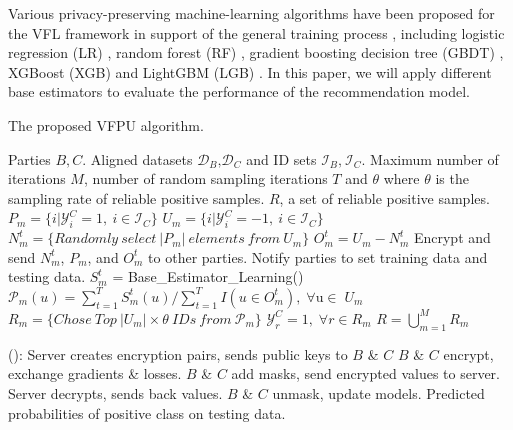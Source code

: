 \documentclass[10pt,journal,compsoc]{IEEEtran}
\begin{document}
\begin{enumerate}[label=(\arabic*)]
	Various privacy-preserving machine-learning algorithms have been proposed for the VFL framework in support of the general training process \cite{yang2019federated}, including logistic regression (LR) \cite{he2021secure,yang2019parallel}, random forest (RF) \cite{yao2022efficient}, gradient boosting decision tree (GBDT) \cite{he2021secure}, XGBoost (XGB) \cite{xu2021efficient,wang2022feverless} and LightGBM (LGB) \cite{feng2019securegbm}. In this paper, we will apply different base estimators to evaluate the performance of the recommendation model. 
	
	\begin{algorithm}[H]
		\caption{The proposed VFPU algorithm.}
		\label{alg:cap}
		\algrenewcommand{}
		\algrenewcommand{}
		\begin{algorithmic}[1]
			\Require Parties $B,C$. Aligned datasets ${{\mathsf{\mathcal{D}}}_{B}}\text{,}{{\mathsf{\mathcal{D}}}_{C}}$  and ID sets ${{\mathsf{\mathcal{I}}}_{B}}\text{,}\ {{\mathsf{\mathcal{I}}}_{C}}$. Maximum number of iterations $M$, number of random sampling iterations $T$ and $\theta$ where $\theta$ is the sampling rate of reliable positive samples.
			\Ensure $R$, a set of reliable positive samples.
			\State ${{P}_{m}}=\{i|\mathsf{\mathcal{Y}}_{i}^{C}=1, \ i\in {{\mathsf{\mathcal{I}}}_{C}}\}$
			\State ${{U}_{m}}=\{i|\mathsf{\mathcal{Y}}_{i}^{C}=-1, \ i\in {{\mathsf{\mathcal{I}}}_{C}}\}$
			\State $N_{m}^{t}=\{Randomly\ select\ |{{P}_{m}}|\ elements\ from\ {{U}_{m}} \}$
			\State $O_{m}^{t}={{U}_{m}}-N_{m}^{t}$
			\State Encrypt and send $N_{m}^{t}$, ${P_m}$, and $O_{m}^{t}$ to other parties.
			\State Notify parties to set training data and testing data.
			\State $S_m^t$ = Base\_Estimator\_Learning()
			\EndFor
			\State ${{\mathsf{\mathcal{P}}}_{m}}(u)={\sum\nolimits_{t=1}^{T}{S_{m}^{t}}}(u)/{\sum\nolimits_{t=1}^{T}{I(u\in O_{m}^{t})\text{,}\ \ \forall \text{u}\in }}\;{{U}_{m}}$
			\State ${{R}_{m}}=\{Chose\ Top\ |{{U}_{m}}|\times \theta \ IDs\ from\ {{\mathsf{\mathcal{P}}}_{m}}\}$
			\State $\mathsf{\mathcal{Y}}_{r}^{C}=1\text{,}\ \ \forall r\in {{R}_{m}}$
			\EndFor
			\State $R=\bigcup\limits_{m=1}^{M}{{{R}_{m}}}$
			\EndProcedure
			
			():
			\State Server creates encryption pairs, sends public keys to $B$ \& $C$
			\State $B$ \& $C$ encrypt, exchange gradients \& losses.
			\State  $B$ \& $C$ add masks, send encrypted values to server.
			\State Server decrypts, sends back values. $B$ \& $C$ unmask, update models.
			\State \Return Predicted probabilities of positive class on testing data.
			\EndFunction
		\end{algorithmic}
	\end{algorithm}
	

\end{enumerate}
\end{document}
